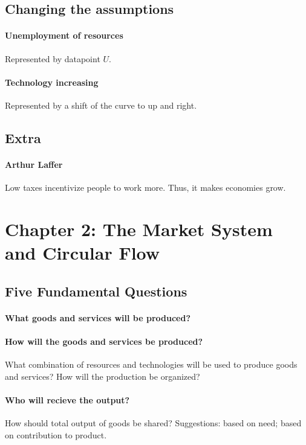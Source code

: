 
\subsection{Changing the assumptions}

\paragraph{Unemployment of resources} Represented by datapoint $U$.

\paragraph{Technology increasing} Represented by a shift of the curve to up and right.

\subsection{Extra}

\paragraph{Arthur Laffer} Low taxes incentivize people to work more. Thus, it makes economies grow.

\newpage
\section{Chapter 2: The Market System and Circular Flow}

\subsection{Five Fundamental Questions}

\paragraph{What goods and services will be produced?} 

\paragraph{How will the goods and services be produced?} What combination of resources and technologies will be used to produce goods and services? How will the production be organized?

\paragraph{Who will recieve the output?} How should total output of goods be shared? Suggestions: based on need; based on contribution to product.

